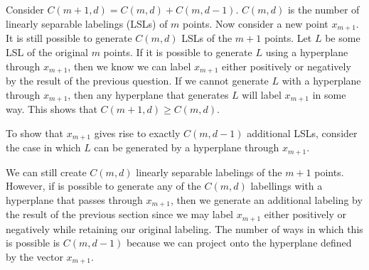 \documentclass[]{article}
\begin{document}
\subsection{}
\subsection{}

Consider $C(m+1,d)=C(m,d) + C(m,d-1)$. $C(m,d)$ is the number of linearly separable labelings (LSLs) of $m$ points. Now consider a new point $x_{m+1}$. It is still possible to generate $C(m,d)$ LSLs of the $m+1$ points. Let $L$ be some LSL of the original $m$ points. If it is possible to generate $L$ using a hyperplane through $x_{m+1}$, then we know we can label $x_{m+1}$ either positively or negatively by the result of the previous question. If we cannot generate $L$ with a hyperplane through $x_{m+1}$, then any hyperplane that generates $L$ will label $x_{m+1}$ in some way. This shows that $C(m+1,d) \ge C(m,d)$.

To show that $x_{m+1}$ gives rise to exactly $C(m,d-1)$ additional LSLs, consider the case in which $L$ can be generated by a hyperplane through $x_{m+1}$. 

We can still create $C(m,d)$ linearly separable labelings of the $m+1$ points. However, if is possible to generate any of the $C(m,d)$ labellings with a hyperplane that passes through $x_{m+1}$, then we generate an additional labeling by the result of the previous section since we may label $x_{m+1}$ either positively or negatively while retaining our original labeling. The number of ways in which this is possible is $C(m,d-1)$ because we can project onto the hyperplane defined by the vector $x_{m+1}$. 
\end{document}
